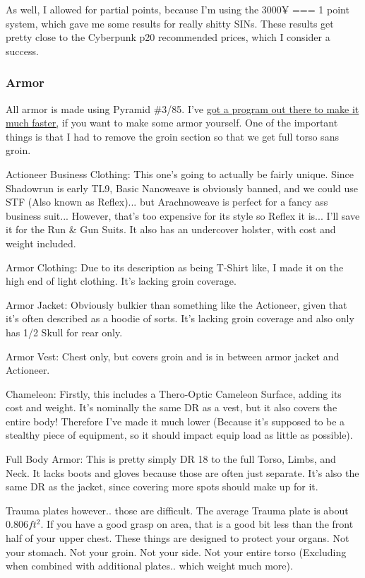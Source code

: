 \begin{multicols*}{2}
	As well, I allowed for partial points, because I'm using the 3000¥ === 1 point system, which gave me some results for really shitty SINs. These results get pretty close to the Cyberpunk p20 recommended prices, which I consider a success.
	
	\subsubsection{Armor}
	
	All armor is made using Pyramid \#3/85. I've \textcolor{Blue}{\href{https://github.com/ingeanus/GURPS_Eidetic_Memory}{got a program out there to make it much faster,}} if you want to make some armor yourself. One of the important things is that I had to remove the groin section so that we get full torso sans groin.
	
	Actioneer Business Clothing: This one's going to actually be fairly unique. Since Shadowrun is early TL9, Basic Nanoweave is obviously banned, and we could use STF (Also known as Reflex)... but Arachnoweave is perfect for a fancy ass business suit... However, that's too expensive for its style so Reflex it is... I'll save it for the Run \& Gun Suits. It also has an undercover holster, with cost and weight included.
	
	Armor Clothing: Due to its description as being T-Shirt like, I made it on the high end of light clothing. It's lacking groin coverage.
	
	Armor Jacket: Obviously bulkier than something like the Actioneer, given that it's often described as a hoodie of sorts. It's lacking groin coverage and also only has 1/2 Skull for rear only.
	
	Armor Vest: Chest only, but covers groin and is in between armor jacket and Actioneer.
	
	Chameleon: Firstly, this includes a Thero-Optic Cameleon Surface, adding its cost and weight. It's nominally the same DR as a vest, but it also covers the entire body! Therefore I've made it much lower (Because it's supposed to be a stealthy piece of equipment, so it should impact equip load as little as possible).
	
	Full Body Armor: This is pretty simply DR 18 to the full Torso, Limbs, and Neck. It lacks boots and gloves because those are often just separate. It's also the same DR as the jacket, since covering more spots should make up for it.
	
	Trauma plates however.. those are difficult. The average Trauma plate is about \(0.806 ft^2\). If you have a good grasp on area, that is a good bit less than the front half of your upper chest. These things are designed to protect your organs. Not your stomach. Not your groin. Not your side. Not your entire torso (Excluding when combined with additional plates.. which weight much more).
	

\end{multicols*}

